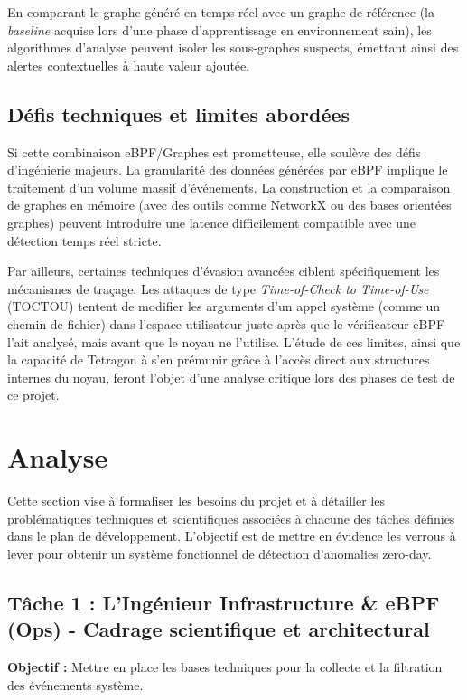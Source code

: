 \documentclass[a4paper,12pt]{article}
\begin{document}
En comparant le graphe généré en temps réel avec un graphe de référence (la \textit{baseline} acquise lors d'une phase d'apprentissage en environnement sain), les algorithmes d'analyse peuvent isoler les sous-graphes suspects, émettant ainsi des alertes contextuelles à haute valeur ajoutée.

\subsection{Défis techniques et limites abordées}
Si cette combinaison eBPF/Graphes est prometteuse, elle soulève des défis d'ingénierie majeurs. La granularité des données générées par eBPF implique le traitement d'un volume massif d'événements. La construction et la comparaison de graphes en mémoire (avec des outils comme NetworkX ou des bases orientées graphes) peuvent introduire une latence difficilement compatible avec une détection temps réel stricte.

Par ailleurs, certaines techniques d'évasion avancées ciblent spécifiquement les mécanismes de traçage. Les attaques de type \textit{Time-of-Check to Time-of-Use} (TOCTOU) tentent de modifier les arguments d'un appel système (comme un chemin de fichier) dans l'espace utilisateur juste après que le vérificateur eBPF l'ait analysé, mais avant que le noyau ne l'utilise. L'étude de ces limites, ainsi que la capacité de Tetragon à s'en prémunir grâce à l'accès direct aux structures internes du noyau, feront l'objet d'une analyse critique lors des phases de test de ce projet.

\section{Analyse}

Cette section vise à formaliser les besoins du projet et à détailler les problématiques techniques et scientifiques associées à chacune des tâches définies dans le plan de développement. L'objectif est de mettre en évidence les verrous à lever pour obtenir un système fonctionnel de détection d’anomalies zero-day.

\subsection{Tâche 1 : L'Ingénieur Infrastructure \& eBPF (Ops) - Cadrage scientifique et architectural}

\textbf{Objectif :} Mettre en place les bases techniques pour la collecte et la filtration des événements système.
\end{document}

